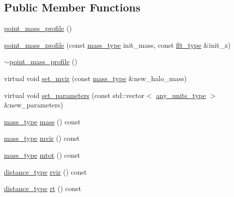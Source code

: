\subsection*{Public Member Functions}
\begin{DoxyCompactItemize}
\item 
\hyperlink{classIceBRG_1_1point__mass__profile_aa256a4ac1d4761e720bc2a14f9803977}{point\+\_\+mass\+\_\+profile} ()
\item 
\hyperlink{classIceBRG_1_1point__mass__profile_a29746e6ba6a4be9dadbe3d659534c2cb}{point\+\_\+mass\+\_\+profile} (const \hyperlink{namespaceIceBRG_a1be72ac4918a9b029f2eefa084213e35}{mass\+\_\+type} init\+\_\+mass, const \hyperlink{lib_2IceBRG__main_2common_8h_ad0f130a56eeb944d9ef2692ee881ecc4}{flt\+\_\+type} \&init\+\_\+z)
\item 
\hyperlink{classIceBRG_1_1point__mass__profile_a1257cba930c725978837df2e273c1c09}{$\sim$point\+\_\+mass\+\_\+profile} ()
\item 
virtual void \hyperlink{classIceBRG_1_1point__mass__profile_adafe681034de7a44632a7b37e8109e1e}{set\+\_\+mvir} (const \hyperlink{namespaceIceBRG_a1be72ac4918a9b029f2eefa084213e35}{mass\+\_\+type} \&new\+\_\+halo\+\_\+mass)
\item 
virtual void \hyperlink{classIceBRG_1_1point__mass__profile_ac0577c7e2ff4877d57074c10ae18342d}{set\+\_\+parameters} (const std\+::vector$<$ \hyperlink{namespaceIceBRG_a3101fc159e191fa99c4ec14e445df96e}{any\+\_\+units\+\_\+type} $>$ \&new\+\_\+parameters)
\item 
\hyperlink{namespaceIceBRG_a1be72ac4918a9b029f2eefa084213e35}{mass\+\_\+type} \hyperlink{classIceBRG_1_1point__mass__profile_a93b3e78de217f95ab5ffe1109b07267f}{mass} () const 
\item 
\hyperlink{namespaceIceBRG_a1be72ac4918a9b029f2eefa084213e35}{mass\+\_\+type} \hyperlink{classIceBRG_1_1point__mass__profile_a8f9a6a1fafe39c216349ff92e1046b53}{mvir} () const 
\item 
\hyperlink{namespaceIceBRG_a1be72ac4918a9b029f2eefa084213e35}{mass\+\_\+type} \hyperlink{classIceBRG_1_1point__mass__profile_a1454cc006571f6a245e8e5046ee20bc5}{mtot} () const 
\item 
\hyperlink{namespaceIceBRG_a45499647eb87e24c10ab32c628711cec}{distance\+\_\+type} \hyperlink{classIceBRG_1_1point__mass__profile_a987603509622d26dbc20181954271c26}{rvir} () const 
\item 
\hyperlink{namespaceIceBRG_a45499647eb87e24c10ab32c628711cec}{distance\+\_\+type} \hyperlink{classIceBRG_1_1point__mass__profile_a313b65ebd5fcba8e073edabe82484b18}{rt} () const 

\end{DoxyCompactItemize}
